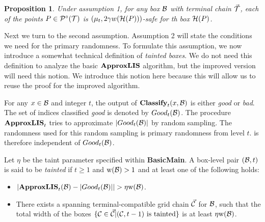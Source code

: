 \documentclass{acmsmall}
\newtheorem{prop}[theorem]{Proposition}
\newcommand{\cB}{{\cal B}}
\newcommand{\cC}{{\cal C}}
\newcommand{\cH}{{\cal H}}
\newcommand{\cP}{{\cal P}}
\newcommand{\cT}{{\cal T}}
\newcommand{\cU}{{\cal U}}
\newcommand{\taint}{\eta}
\newcommand{\width}{{\bf {\rm  w}}}
\newcommand{\classify}{{\rm {\bf Classify}}}
\newcommand{\basicmain}{{\rm {\bf BasicMain}}}
\newcommand{\approxlis}{{\rm {\bf ApproxLIS}}}
\newcommand{\findsplitter}{{\rm {\bf FindSplitter}}}
\newcommand{\buildgrid}{{\rm {\bf BuildGrid}}}
\begin{document}
\begin{prop}
\label{prop:ass 1 cons}
Under assumption 1, for any box $\cB$ with terminal chain $\vec{\cT}$, each of the
points $P \in \cP^{\circ}(\cT)$ is $(\mu_t,2\gamma w(\cH(P)))$-safe for th box $\cH(P)$.
\end{prop}

%
%
%
%

Next we turn to the second assumption.
Assumption 2 will state the conditions we need for the primary randomness.  
To formulate this assumption,
we now  introduce  a somewhat technical definition of \emph{tainted boxes}. 
We do not need this definition to analyze the basic  $\approxlis$ algorithm, but
the improved version will need this notion.   We introduce this notion here because
this will allow us to reuse the proof for the improved algorithm.  


For any $x \in \cB$ and integer $t$, the output of $\classify_t(x,\cB)$ is either \emph{good}
or \emph{bad}.
The set of indices classified \emph{good} is denoted by $Good_t(\cB)$.
The procedure $\approxlis_t$ tries to approximate $|Good_t(\cB)|$ by random sampling.
The randomness used for this random sampling is primary randomness from level $t$.
 is therefore  independent of $Good_t(\cB)$.

\begin{definition} \label{def:tainted}  Let $\taint$ be the taint parameter specified 
within \basicmain{}.
A box-level pair $(\cB,t)$ is said to be \emph{tainted} if $t \geq 1$ and $\width(\cB)>1$ and at least one of the following holds:
\begin{itemize}
	\item $|\approxlis_t(\cB)  - |Good_t(\cB)|| > \taint \width(\cB)$.
	\item There exists a  spanning terminal-compatible grid chain $\vec{\cC}$ for $\cB$, such that 
	the total width of the boxes $\{\cC \in \vec{\cC} | \textrm{$(\cC,t-1)$ is tainted}\}$ is at least $\taint \width(\cB)$.
\end{itemize}
\end{definition}
\end{document}
